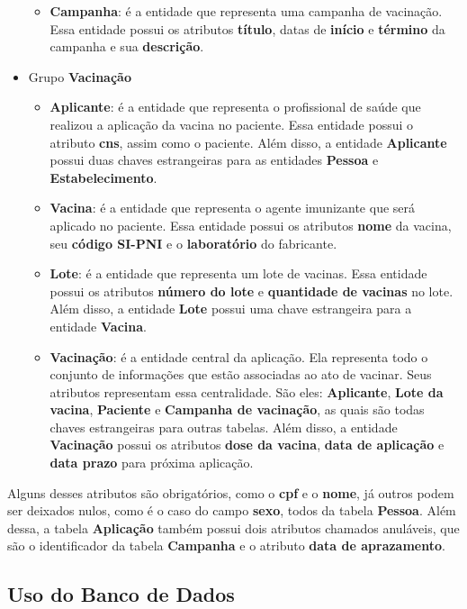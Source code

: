 \begin{itemize}
\begin{itemize}
    \item \textbf{Campanha}: é a entidade que representa uma campanha de vacinação. Essa entidade possui os atributos \textbf{título}, datas de \textbf{início} e \textbf{término} da campanha e sua \textbf{descrição}.
  \end{itemize}
  \item Grupo \textbf{Vacinação}
  \begin{itemize}
    \item \textbf{Aplicante}: é a entidade que representa o profissional de saúde que realizou a aplicação da vacina no paciente. Essa entidade possui o atributo \textbf{cns}, assim como o paciente. Além disso, a entidade \textbf{Aplicante} possui duas chaves estrangeiras para as entidades \textbf{Pessoa} e \textbf{Estabelecimento}.
    \item \textbf{Vacina}: é a entidade que representa o agente imunizante que será aplicado no paciente. Essa entidade possui os atributos \textbf{nome} da vacina, seu \textbf{código SI-PNI} e o \textbf{laboratório} do fabricante.
    \item \textbf{Lote}: é a entidade que representa um lote de vacinas. Essa entidade possui os atributos \textbf{número do lote} e \textbf{quantidade de vacinas} no lote. Além disso, a entidade \textbf{Lote} possui uma chave estrangeira para a entidade \textbf{Vacina}.
    \item \textbf{Vacinação}: é a entidade central da aplicação. Ela representa todo o conjunto de informações que estão associadas ao ato de vacinar. Seus atributos representam essa centralidade. São eles: \textbf{Aplicante}, \textbf{Lote da vacina}, \textbf{Paciente} e \textbf{Campanha de vacinação}, as quais são todas chaves estrangeiras para outras tabelas. Além disso, a entidade \textbf{Vacinação} possui os atributos \textbf{dose da vacina}, \textbf{data de aplicação} e \textbf{data prazo} para próxima aplicação.
  \end{itemize}
\end{itemize}

Alguns desses atributos são obrigatórios, como o \textbf{cpf} e o \textbf{nome}, já outros podem ser deixados nulos, como é o caso do campo \textbf{sexo}, todos da tabela \textbf{Pessoa}. Além dessa, a tabela \textbf{Aplicação} também possui dois atributos chamados anuláveis, que são o identificador da tabela \textbf{Campanha} e o atributo \textbf{data de aprazamento}.

\subsection{Uso do Banco de Dados}
\label{cap4:Sec:UsoBancoDados}
















